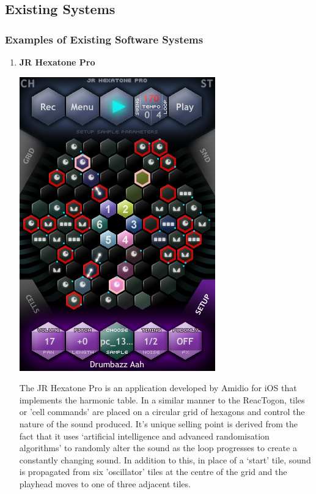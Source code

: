 \documentclass[10pt,a4paper]{article}
\begin{document}
\subsection{Existing Systems}
\subsubsection{Examples of Existing Software Systems}
\begin{enumerate}
\item \textbf{JR Hexatone Pro}
\begin{center}
\includegraphics[scale=0.35]{2.jpg}
\end{center}
The JR Hexatone Pro is an application developed by Amidio for iOS that implements the harmonic table\cite{jrhexitunes}.  In a similar manner to the ReacTogon, tiles or 'cell commands’ are placed on a circular grid of hexagons and control the nature of the sound produced. It’s unique selling point is derived from the fact that it uses `artificial intelligence and advanced randomisation algorithms' to randomly alter the sound as the loop progresses to create a constantly changing sound. In addition to this, in place of a `start’ tile, sound is propagated from six 'oscillator' tiles at the centre of the grid and the playhead moves to one of three adjacent tiles. \cite{amidiomanual}


\end{enumerate}
\end{document}
